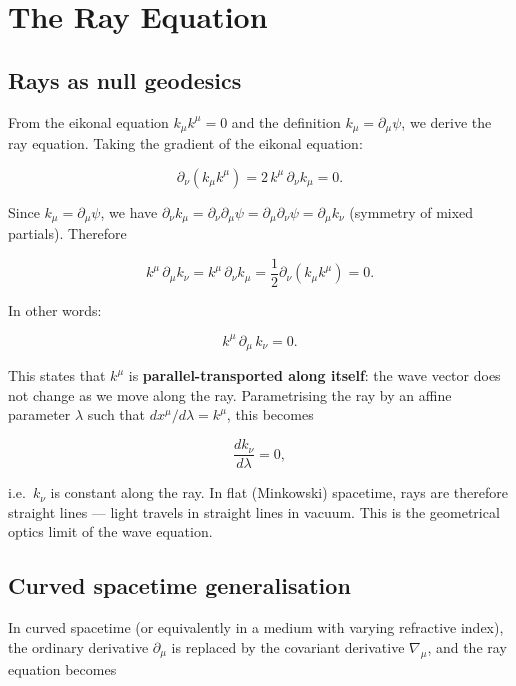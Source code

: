 \section{The Ray Equation}

\subsection{Rays as null geodesics}

From the eikonal equation $k_\mu k^\mu = 0$ and the definition $k_\mu = \partial_\mu\psi$, we derive the ray equation. Taking the gradient of the eikonal equation:

\begin{equation}
\partial_\nu(k_\mu k^\mu) = 2\,k^\mu\,\partial_\nu k_\mu = 0.
\end{equation}

Since $k_\mu = \partial_\mu\psi$, we have $\partial_\nu k_\mu = \partial_\nu\partial_\mu\psi = \partial_\mu\partial_\nu\psi = \partial_\mu k_\nu$ (symmetry of mixed partials). Therefore

\begin{equation}
k^\mu\,\partial_\mu k_\nu = k^\mu\,\partial_\nu k_\mu = \frac{1}{2}\partial_\nu(k_\mu k^\mu) = 0.
\end{equation}

In other words:

\begin{equation}
\boxed{k^\mu\,\partial_\mu\,k_\nu = 0.}
\end{equation}

This states that $k^\mu$ is \textbf{parallel-transported along itself}: the wave vector does not change as we move along the ray. Parametrising the ray by an affine parameter $\lambda$ such that $dx^\mu/d\lambda = k^\mu$, this becomes

\begin{equation}
\frac{dk_\nu}{d\lambda} = 0,
\end{equation}

i.e.\ $k_\nu$ is constant along the ray. In flat (Minkowski) spacetime, rays are therefore straight lines --- light travels in straight lines in vacuum. This is the geometrical optics limit of the wave equation.

\subsection{Curved spacetime generalisation}

In curved spacetime (or equivalently in a medium with varying refractive index), the ordinary derivative $\partial_\mu$ is replaced by the covariant derivative $\nabla_\mu$, and the ray equation becomes

